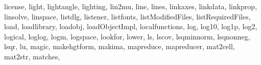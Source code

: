 {{        license,%
        light,%
        lightangle,%
        lighting,%
        lin2mu,%
        line,%
        lines,%
        linkaxes,%
        linkdata,%
        linkprop,%
        linsolve,%
        linspace,%
        listdlg,%
        listener,%
        listfonts,%
        listModifiedFiles,%
        listRequiredFiles,%
        load,%
        loadlibrary,%
        loadobj,%
        loadObjectImpl,%
        localfunctions,%
        log,%
        log10,%
        log1p,%
        log2,%
        logical,%
        loglog,%
        logm,%
        logspace,%
        lookfor,%
        lower,%
        ls,%
        lscov,%
        lsqminnorm,%
        lsqnonneg,%
        lsqr,%
        lu,%
        magic,%
        makehgtform,%
        makima,%
        mapreduce,%
        mapreducer,%
        mat2cell,%
        mat2str,%
        matches,%
}}
